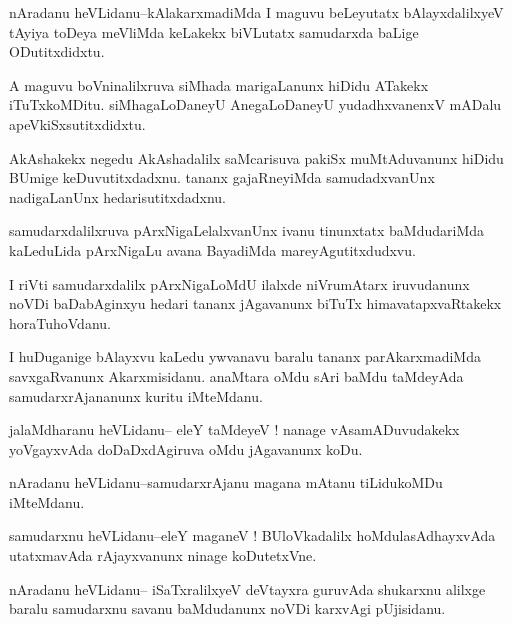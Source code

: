 \documentclass{article}
\begin{document}
\begin{mn}%
nAradanu heVLidanu--kAlakarxmadiMda I maguvu beLeyutatx bAlayxdalilxyeV tAyiya toDeya 
meVliMda keLakekx biVLutatx samudarxda baLige ODutitxdidxtu.
\end{mn}

\begin{mn}%
A maguvu boVninalilxruva siMhada marigaLanunx hiDidu ATakekx iTuTxkoMDitu. siMhagaLoDaneyU 
AnegaLoDaneyU yudadhxvanenxV mADalu apeVkiSxsutitxdidxtu.
\end{mn}

\begin{mn}%
AkAshakekx negedu AkAshadalilx saMcarisuva pakiSx muMtAduvanunx hiDidu BUmige 
keDuvutitxdadxnu. tananx gajaRneyiMda samudadxvanUnx nadigaLanUnx hedarisutitxdadxnu.
\end{mn}

\begin{mn}%
samudarxdalilxruva pArxNigaLelalxvanUnx ivanu tinunxtatx baMdudariMda kaLeduLida pArxNigaLu 
avana BayadiMda mareyAgutitxdudxvu.
\end{mn}

\begin{mn}%
I riVti samudarxdalilx pArxNigaLoMdU ilalxde niVrumAtarx iruvudanunx noVDi baDabAginxyu 
hedari tananx jAgavanunx biTuTx himavatapxvaRtakekx horaTuhoVdanu.
\end{mn}

\begin{mn}%
I huDuganige bAlayxvu kaLedu ywvanavu baralu tananx parAkarxmadiMda savxgaRvanunx 
Akarxmisidanu. anaMtara oMdu sAri baMdu taMdeyAda samudarxrAjananunx kuritu iMteMdanu.
\end{mn}

\begin{mn}%
jalaMdharanu heVLidanu-- eleY taMdeyeV ! nanage vAsamADuvudakekx yoVgayxvAda doDaDxdAgiruva 
oMdu jAgavanunx koDu.
\end{mn}

\begin{mn}%
nAradanu heVLidanu--samudarxrAjanu magana mAtanu tiLidukoMDu iMteMdanu.
\end{mn}

\begin{mn}%
samudarxnu heVLidanu--eleY maganeV ! BUloVkadalilx hoMdulasAdhayxvAda utatxmavAda 
rAjayxvanunx ninage koDutetxVne.
\end{mn}

\begin{mn}%
nAradanu heVLidanu-- iSaTxralilxyeV deVtayxra guruvAda shukarxnu alilxge baralu samudarxnu 
savanu baMdudanunx noVDi karxvAgi pUjisidanu.
\end{mn}
\end{document}
